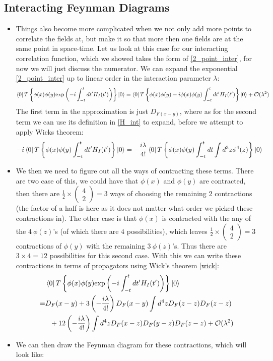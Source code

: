 \documentclass[11pt]{article}
\numberwithin{equation}{section}
\begin{document}
\subsection{Interacting Feynman Diagrams} %
\label{sub:interacting_feynman_diagrams}
\begin{itemize}
  \item Things also become more complicated when we not only add more points to correlate the fields at, but make it so that more then one fields are at the same point in space-time. Let us look at this case for our interacting correlation function, which we showed takes the form of \ref{2_point_inter}, for now we will just discuss the numerator. We can expand the exponential \ref{2_point_inter} up to linear order in the interaction parameter $\lambda$:
  \begin{align*}
    \bra{0}T\left\{\phi(x)\phi(y)\text{exp}\left(-i\int_{-t}^{t}dt'H_{I}(t')\right)\right\}\ket{0} = \bra{0}T\left\{\phi(x)\phi(y)-i\phi(x)\phi(y)\int_{-t}^{t}dt'H_{I}(t')\right\}\ket{0} + \mathcal{O}(\lambda^2)
  \end{align*}
  The first term in the approximation is just $D_{F(x-y)}$, where as for the second term we can use its definition in \ref{H_int} to expand, before we attempt to apply Wicks theorem:
  \begin{align*}
    -i\bra{0}T\left\{\phi(x)\phi(y)\int_{-t}^{t}dt'H_{I}(t')\right\}&\ket{0}=-\frac{i\lambda}{4!}\bra{0}T\left\{\phi(x)\phi(y)\int_{-t}^{t}dt\int d^3z\phi^4(z)\right\}\ket{0} 
  \end{align*}
  \item We then we need to figure out all the ways of contracting these terms. There are two case of this, we could have that $\phi(x)$ and $\phi(y)$ are contracted, then there are $\frac{1}{2} \times \begin{pmatrix}
    4 \\ 2
  \end{pmatrix} = 3$ ways of choosing the remaining $2$ contractions (the factor of a half is here as it does not matter what order we picked these contractions in).  The other case is that $\phi(x)$ is contracted with the any of the $4~\phi(z)$'s (of which there are $4$ possibilities), which leaves  $\frac{1}{2} \times \begin{pmatrix}
    4 \\ 2
  \end{pmatrix} = 3$ contractions of $\phi(y)$ with the remaining $3~\phi(z)$'s. Thus there are $3\times4 =12$ possibilities for this second case. With this we can write these contractions in terms of propagators using Wick's theorem \ref{wick}: 
  \begin{align*}
   & \bra{0}T\left\{\phi(x)\phi(y)\text{exp}\left(-i\int_{-t}^{t}dt'H_{I}(t')\right)\right\}\ket{0}  \\
    = & D_F(x-y) +3\left(-\frac{i\lambda}{4!}\right)D_{F}(x-y)\int d^4zD_F(z-z)D_F(z-z) \\
    &~~ + 12\left(-\frac{i\lambda}{4!}\right)\int d^4zD_{F}(x-z)D_F(y-z)D_F(z-z) + \mathcal{O}(\lambda^2)
  \end{align*} 
  \item We can then draw the Feynman diagram for these contractions, which will look like:


\end{itemize}
\end{document}
